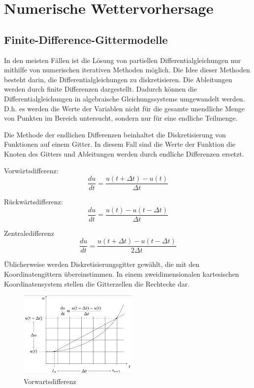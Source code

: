 %
%
%
%
\section{Numerische Wettervorhersage
\label{spektral:section:nwp}}

\subsection{Finite-Difference-Gittermodelle
\label{spektral:subsection:gittermodelle}}
In den meisten Fällen ist die Lösung von partiellen Differentialgleichungen nur mithilfe von numerischen iterativen Methoden möglich. 
Die Idee dieser Methoden besteht darin, die Differentialgleichungen zu diskretisieren.
Die Ableitungen werden durch finite Differenzen dargestellt.
Dadurch können die Differentialgleichungen in algebraische Gleichungssysteme umgewandelt werden.
D.h. es werden die Werte der Variablen nicht für die gesamte unendliche Menge von Punkten im Bereich untersucht, sondern nur für eine endliche Teilmenge.

Die Methode der endlichen Differenzen beinhaltet die Diskretisierung von Funktionen auf einem Gitter.
In diesem Fall sind die Werte der Funktion die Knoten des Gitters und Ableitungen werden durch endliche Differenzen ersetzt.

Vorwärtsdifferenz:
\begin{equation}
\frac{du}{dt} = \frac{u(t + \Delta{t}) - u(t)}{\Delta{t}}
\label{spektral:equation1}
\end{equation}

Rückwärtsdifferenz:
\begin{equation}
\frac{du}{dt} = \frac{u(t) - u(t - \Delta{t})}{\Delta{t}}
\label{spektral:equation2}
\end{equation}

Zentraledifferenz
\begin{equation}
\frac{du}{dt} = \frac{u(t + \Delta{t}) - u(t - \Delta{t})}{2\Delta{t}}
\label{spektral:equation3}
\end{equation}

Üblicherweise werden Diskretisierungsgitter gewählt, die mit den Koordinatengittern übereinstimmen.
In einem zweidimensionalen kartesischen Koordinatensystem stellen die Gitterzellen die Rechtecke dar.
\pagebreak
\begin{figure}[h]
	\centering
	\includegraphics[height=120pt]{papers/spektral/images/forwarddiff.png}
	\caption{Vorwartsdifferenz}
    \label{spektral:fig:gittermodelle}
\end{figure}

